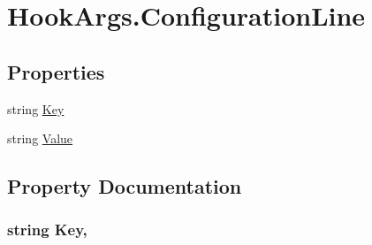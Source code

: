\hypertarget{structOTA_1_1Plugin_1_1HookArgs_1_1ConfigurationLine}{}\section{Hook\+Args.\+Configuration\+Line}
\label{structOTA_1_1Plugin_1_1HookArgs_1_1ConfigurationLine}
\subsection*{Properties}
\begin{DoxyCompactItemize}
\item 
string \hyperlink{structOTA_1_1Plugin_1_1HookArgs_1_1ConfigurationLine_a67259580f3bed3976cf28dea92a19d30}{Key}
\item 
string \hyperlink{structOTA_1_1Plugin_1_1HookArgs_1_1ConfigurationLine_af7b88db799d8f791f785e437bc6099d2}{Value}
\end{DoxyCompactItemize}


\subsection{Property Documentation}
\hypertarget{structOTA_1_1Plugin_1_1HookArgs_1_1ConfigurationLine_a67259580f3bed3976cf28dea92a19d30}{}
\subsubsection[{Key}]{\setlength{\rightskip}{0pt plus 5cm}string Key\hspace{0.3cm}{\ttfamily [get]}, {\ttfamily [set]}}\label{structOTA_1_1Plugin_1_1HookArgs_1_1ConfigurationLine_a67259580f3bed3976cf28dea92a19d30}
\hypertarget{structOTA_1_1Plugin_1_1HookArgs_1_1ConfigurationLine_af7b88db799d8f791f785e437bc6099d2}{}

